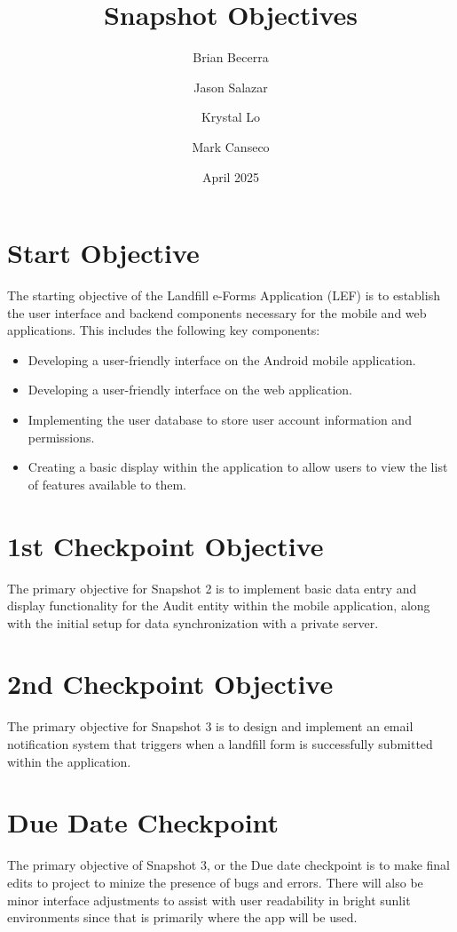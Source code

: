 \documentclass[12pt]{article}
\title{Snapshot Objectives}
\author{
    Brian Becerra\\
    \and
    Jason Salazar\\
    \and
    Krystal Lo\\
    \and
    Mark Canseco\\
    }
\date{April 2025}
\begin{document}
\begin{titlepage}
\maketitle
\thispagestyle{empty}
\end{titlepage}

\section*{Start Objective}
The starting objective of the Landfill e-Forms Application (LEF) is to establish the user interface and backend components necessary for the mobile and web applications. This includes the following key components:\\
\begin{itemize}
    \item Developing a user-friendly interface on the Android mobile application.
    \item  Developing a user-friendly interface on the web application.
    \item Implementing the user database to store user account information and permissions.
    \item Creating a basic display within the application to allow users to view the list of features available to them. 
\end{itemize}

\section*{1st Checkpoint Objective}

The primary objective for Snapshot 2 is to implement basic data entry and display functionality for the Audit entity within the mobile application, along with the initial setup for data synchronization with a private server.

\section*{2nd Checkpoint Objective}

The primary objective for Snapshot 3 is to design and implement an email notification system that triggers when a landfill form is successfully submitted within the application.

\section*{Due Date Checkpoint}

The primary objective of Snapshot 3, or the Due date checkpoint is to make final edits to project to minize the presence of bugs and errors. There will also be minor interface adjustments to assist with user readability in bright sunlit environments since that is primarily where the app will be used.
\end{document}
